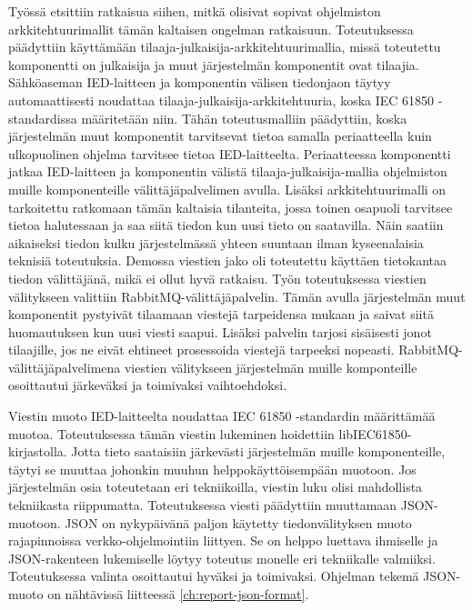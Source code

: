 Työssä etsittiin ratkaisua siihen, mitkä olisivat sopivat ohjelmiston arkkitehtuurimallit tämän kaltaisen ongelman ratkaisuun. Toteutuksessa päädyttiin käyttämään tilaaja-julkaisija-arkkitehtuurimallia, missä toteutettu komponentti on julkaisija ja muut järjestelmän komponentit ovat tilaajia. Sähköaseman IED-laitteen ja komponentin välisen tiedonjaon täytyy automaattisesti noudattaa tilaaja-julkaisija-arkkitehtuuria, koska IEC 61850 -stan\-dar\-dis\-sa määritetään niin. Tähän toteutusmalliin päädyttiin, koska järjestelmän muut komponentit tarvitsevat tietoa samalla periaatteella kuin ulkopuolinen ohjelma tarvitsee tietoa IED-laitteelta. Periaatteessa komponentti jatkaa IED-laitteen ja komponentin välistä tilaaja-julkaisija-mallia ohjelmiston muille komponenteille välittäjäpalvelimen avulla. Lisäksi arkkitehtuurimalli on tarkoitettu ratkomaan tämän kaltaisia tilanteita, jossa toinen osapuoli tarvitsee tietoa halutessaan ja saa siitä tiedon kun uusi tieto on saatavilla. Näin saatiin aikaiseksi tiedon kulku järjestelmässä yhteen suuntaan ilman kyseenalaisia teknisiä toteutuksia. Demossa viestien jako oli toteutettu käyttäen tietokantaa tiedon välittäjänä, mikä ei ollut hyvä ratkaisu. Työn toteutuksessa viestien välitykseen valittiin RabbitMQ-välittäjäpalvelin. Tämän avulla järjestelmän muut komponentit pystyivät tilaamaan viestejä tarpeidensa mukaan ja saivat siitä huomautuksen kun uusi viesti saapui. Lisäksi palvelin tarjosi sisäisesti jonot tilaajille, jos ne eivät ehtineet prosessoida viestejä tarpeeksi nopeasti. RabbitMQ-välittäjäpalvelimena viestien välitykseen järjestelmän muille komponteille osoittautui järkeväksi ja toimivaksi vaihtoehdoksi.

Viestin muoto IED-laitteelta noudattaa IEC 61850 -standardin määrittämää muotoa. Toteutuksessa tämän viestin lukeminen hoidettiin libIEC61850-kirjastolla. Jotta tieto saataisiin järkevästi järjestelmän muille komponenteille, täytyi se muuttaa johonkin muuhun helppokäyttöisempään muotoon. Jos järjestelmän osia toteutetaan eri tekniikoilla, viestin luku olisi mahdollista tekniikasta riippumatta. Toteutuksessa viesti päädyttiin muuttamaan JSON-muotoon. JSON on nykypäivänä paljon käytetty tiedonvälityksen muoto rajapinnoissa verkko-ohjelmointiin liittyen. Se on helppo luettava ihmiselle ja JSON-rakenteen lukemiselle löytyy toteutus monelle eri tekniikalle valmiiksi. Toteutuksessa valinta osoittautui hyväksi ja toimivaksi. Ohjelman tekemä JSON-muoto on nähtävissä liitteessä \ref{ch:report-json-format}.

